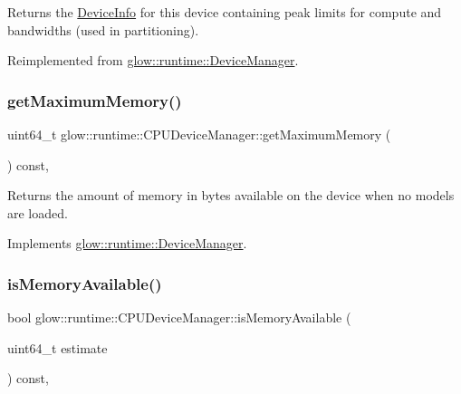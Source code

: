 Returns the \hyperlink{structglow_1_1runtime_1_1_device_info}{Device\+Info} for this device containing peak limits for compute and bandwidths (used in partitioning). 

Reimplemented from \hyperlink{classglow_1_1runtime_1_1_device_manager_aaf319fc3b9aa67c5e053bdf690e89d34}{glow\+::runtime\+::\+Device\+Manager}.

\mbox{\label{classglow_1_1runtime_1_1_c_p_u_device_manager_a865758926a01983e4867ce0c2583ec3a}} 
\subsubsection{\texorpdfstring{get\+Maximum\+Memory()}{getMaximumMemory()}}
{\footnotesize\ttfamily uint64\+\_\+t glow\+::runtime\+::\+C\+P\+U\+Device\+Manager\+::get\+Maximum\+Memory (\begin{DoxyParamCaption}{ }\end{DoxyParamCaption}) const\hspace{0.3cm}{\ttfamily [override]}, {\ttfamily [virtual]}}

Returns the amount of memory in bytes available on the device when no models are loaded. 

Implements \hyperlink{classglow_1_1runtime_1_1_device_manager_ad158f1c1f9f32b48927f50d48f80decb}{glow\+::runtime\+::\+Device\+Manager}.

\mbox{\label{classglow_1_1runtime_1_1_c_p_u_device_manager_a61e188ea68529ec4a4037e7df81f98f8}} 
\subsubsection{\texorpdfstring{is\+Memory\+Available()}{isMemoryAvailable()}}
{\footnotesize\ttfamily bool glow\+::runtime\+::\+C\+P\+U\+Device\+Manager\+::is\+Memory\+Available (\begin{DoxyParamCaption}\item[{uint64\+\_\+t}]{estimate }\end{DoxyParamCaption}) const\hspace{0.3cm}{\ttfamily [override]}, {\ttfamily [virtual]}}

